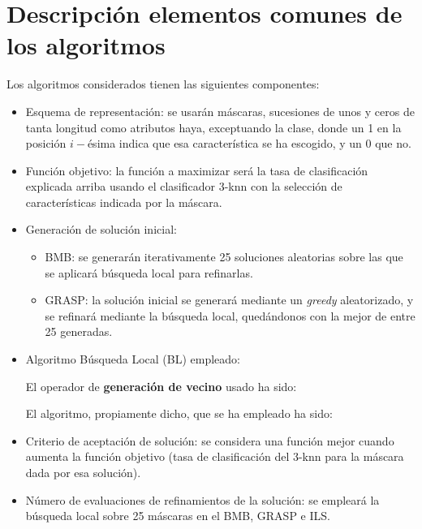 \documentclass[a4paper,11pt]{article}
\begin{document}
\section{Descripción elementos comunes de los algoritmos}
Los algoritmos considerados tienen las siguientes componentes:

\begin{itemize} 
\item Esquema de representación: se usarán máscaras, sucesiones de unos y ceros de tanta longitud como atributos haya,
exceptuando la clase, donde un 1 en la posición $i-$ésima indica que esa característica se ha escogido, y un $0$ que no.

\item Función objetivo: la función a maximizar será la tasa de clasificación explicada arriba usando el clasificador
3-knn con la selección de características indicada por la máscara.

\small\texttt{}

\item Generación de solución inicial: 
  \begin{itemize}
   \item BMB: se generarán iterativamente 25 soluciones aleatorias sobre las que se aplicará búsqueda local
   para refinarlas.
   \item GRASP: la solución inicial se generará mediante un \textit{greedy} aleatorizado, y se refinará mediante
   la búsqueda local, quedándonos con la mejor de entre 25 generadas.
  \end{itemize}


\item Algoritmo Búsqueda Local (BL) empleado:
  
  El operador de \textbf{generación de vecino} usado ha sido:
  
  \small\texttt{}
  
  El algoritmo, propiamente dicho, que se ha empleado ha sido:
  
  \small\texttt{}

\item Criterio de aceptación de solución: se considera una función mejor cuando aumenta la función objetivo (tasa de 
clasificación del 3-knn para la máscara dada por esa solución).
  
\item Número de evaluaciones de refinamientos de la solución: se empleará la búsqueda local sobre 25
máscaras en el BMB, GRASP e ILS.

\end{itemize}
\end{document}
